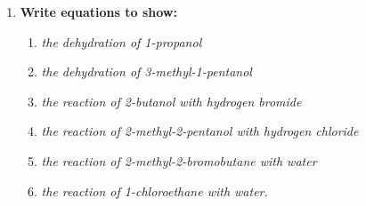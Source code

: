 \documentclass{report}
\begin{document}
	\begin{enumerate}
		\item \textbf{Write equations to show:}

			\begin{enumerate}
				\item \textit{the dehydration of 1-propanol}

					\begin{center}
					\end{center}

				\item \textit{the dehydration of 3-methyl-1-pentanol}

					\begin{center}
					\end{center}

				\item \textit{the reaction of 2-butanol with hydrogen bromide}
					
					\begin{center}
					\end{center}

				\item \textit{the reaction of 2-methyl-2-pentanol with hydrogen chloride}

					\begin{center}
					\end{center}

				\item \textit{the reaction of 2-methyl-2-bromobutane with water}

					\begin{center}
					\end{center}

				\item \textit{the reaction of 1-chloroethane with water.}

					\begin{center}
					\end{center}
			\end{enumerate}


\end{enumerate}
\end{document}
